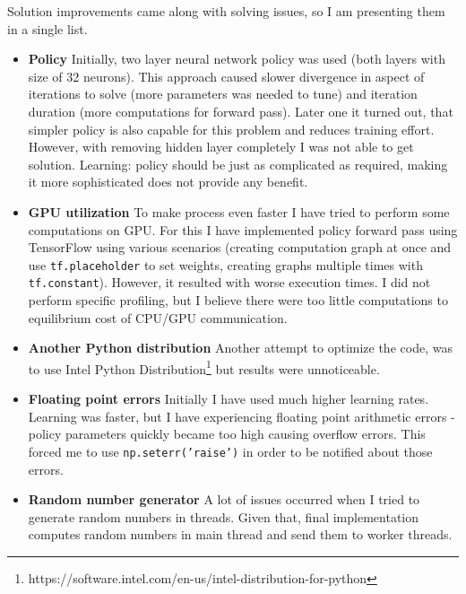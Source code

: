 \documentclass[12pt]{article}
\begin{document}
Solution improvements came along with solving issues, so I am presenting them in a single list.

\begin{itemize}
\item{\textbf{Policy}} Initially, two layer neural network policy was used (both layers with size of 32 neurons). This approach caused slower divergence in aspect of iterations to solve (more parameters was needed to tune) and iteration duration (more computations for forward pass). Later one it turned out, that simpler policy is also capable for this problem and reduces training effort. However, with removing hidden layer completely I was not able to get solution. Learning: policy should be just as complicated as required, making it more sophisticated does not provide any benefit.

\item{\textbf{GPU utilization}} To make process even faster I have tried to perform some computations on GPU. For this I have implemented policy forward pass using TensorFlow\cite{tensorflow} using various scenarios (creating computation graph at once and use \texttt{tf.placeholder} to set weights, creating graphs multiple times with \texttt{tf.constant}). However, it resulted with worse execution times. I did not perform specific profiling, but I believe there were too little computations to equilibrium cost of CPU/GPU communication.

\item{\textbf{Another Python distribution}} Another attempt to optimize the code, was to use Intel Python Distribution\footnote{https://software.intel.com/en-us/intel-distribution-for-python} but results were unnoticeable.

\item{\textbf{Floating point errors}} Initially I have used much higher learning rates. Learning was faster, but I have experiencing floating point arithmetic errors - policy parameters quickly became too high causing overflow errors. This forced me to use \texttt{np.seterr('raise')} in order to be notified about those errors.

\item{\textbf{Random number generator}} A lot of issues occurred when I tried to generate random numbers in threads. Given that, final implementation computes random numbers in main thread and send them to worker threads.

\end{itemize}
\end{document}
